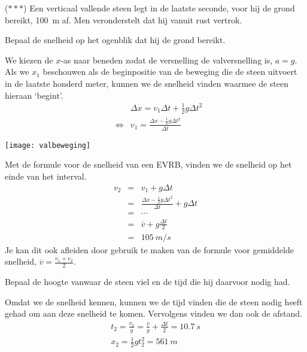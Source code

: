 \documentclass{ximera}
\begin{document}
\begin{exercise}
    ($\ast\ast\ast$) Een verticaal vallende steen legt in de laatste seconde, voor hij de grond bereikt, \SI{100}{m} af. Men veronderstelt dat hij vanuit rust vertrok.
    \begin{question} Bepaal de snelheid op het ogenblik dat hij de grond bereikt.                 
        \begin{oplossing}

            We kiezen de $x$-as naar beneden zodat de versnelling de valversnelling is, $a=g$. Als we $x_1$ beschouwen als de beginpositie van de beweging die de steen uitvoert in de laatste honderd meter, kunnen we de snelheid vinden waarmee de steen hieraan `begint'.
            \begin{eqnarray*}
                &&\Delta x=v_1\Delta t+\frac{1}{2}g\Delta t^2\\
                &\Leftrightarrow&v_1=\frac{\Delta x-\frac{1}{2}g\Delta t^2}{\Delta t}
            \end{eqnarray*}
            \begin{image}
                \texttt{[image: valbeweging]}
            \end{image}
            Met de formule voor de snelheid van een EVRB, vinden we de snelheid op het einde van het interval.
            \begin{eqnarray*}
                v_2&=&v_1+g\Delta t\\
                &=&\frac{\Delta x-\frac{1}{2}g\Delta t^2}{\Delta t}+g\Delta t\\
                &=&\cdots\\
                &=&\overline{v}+g\frac{\Delta t}{2}\\
                &=&\SI{105}{m/s}
            \end{eqnarray*}
            Je kan dit ook afleiden door gebruik te maken van de formule voor gemiddelde snelheid, $\overline{v}=\frac{v_1+v_2}{2}$.
        
        \end{oplossing}
    \end{question}
    \begin{question} Bepaal de hoogte vanwaar de steen viel en de tijd die hij daarvoor nodig had.
        \begin{oplossing}
            Omdat we de snelheid kennen, kunnen we de tijd vinden die de steen nodig heeft gehad om aan deze snelheid te komen. Vervolgens vinden we dan ook de afstand.
            \begin{eqnarray*}
                t_2=\frac{v_2}{g}=\frac{\overline{v}}{g}+\frac{\Delta t}{2}=\SI{10,7}{s}\\
                x_2=\frac{1}{2}gt_2^2=\SI{561}{m}
            \end{eqnarray*}
        \end{oplossing}
    \end{question}
\end{exercise}
\end{document}

